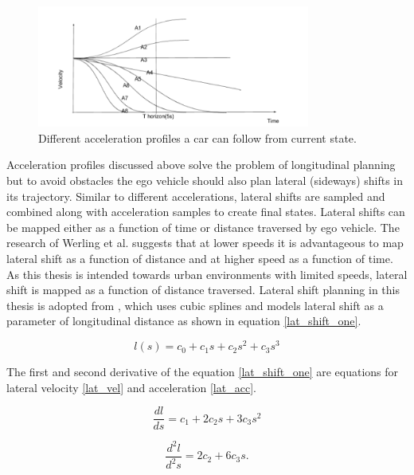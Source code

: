  \begin{figure}[H]
    \centering
    \includegraphics[width=0.8\textwidth]{Images/velcoities.png}
    \caption{Different acceleration profiles a car can follow from current state.}
    \label{velocities}
\end{figure}


Acceleration profiles discussed above solve the problem of longitudinal planning but to avoid obstacles the ego vehicle should also plan lateral (sideways) shifts in its trajectory. Similar to different accelerations, lateral shifts are sampled and combined along with acceleration samples to create final states. Lateral shifts can be mapped either as a function of time or distance traversed by ego vehicle. The research of Werling et al. \cite{werling_frenet} suggests that at lower speeds it is advantageous to map lateral shift as a function of distance and at higher speed as a function of time. As this thesis is intended towards urban environments with limited speeds, lateral shift is mapped as a function of distance traversed. Lateral shift planning in this thesis is adopted from \cite{real_time_traj_plan_article}, which uses cubic splines and models lateral shift as a parameter of longitudinal distance as shown in equation \ref{lat_shift_one}. 

\begin{equation}
l(s) = c_0 + c_1s + c_2s^2 + c_3s^3
\label{lat_shift_one}
\end{equation}

The first and second derivative of the equation \ref{lat_shift_one} are equations for lateral velocity \ref{lat_vel} and acceleration \ref{lat_acc}.

\begin{equation}
    \frac{dl}{ds} = c_1 + 2c_2s + 3c_3s^2
\label{lat_vel}
\end{equation}


\begin{equation}
    \frac{d^2l}{d^2s} = 2c_2 + 6c_3s.
\label{lat_acc}    
\end{equation}

